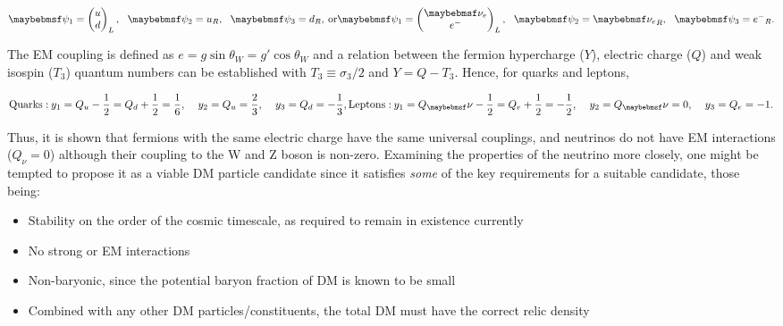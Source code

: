 \begin{equation} 
  \psi_1 = \begin{pmatrix} u \\ d \end{pmatrix}_L, \:\:\: \psi_2 = u_R, \:\:\: \psi_3 = d_R,\:\mathrm{or} \\
  \psi_1 = \begin{pmatrix} \nu_e \\ e^- \end{pmatrix}_L, \:\:\: \psi_2 = {\nu_e}_R, \:\:\: \psi_3 = {e^-}_R.
\end{equation}

The EM coupling is defined as $e = g\sin\theta_W = g'\cos\theta_W$ and a relation between the fermion hypercharge ($Y$), electric charge ($Q$) and weak isospin ($T_3$) quantum numbers can be established with $T_3 \equiv \sigma_3/2$ and $Y = Q - T_3$. Hence, for quarks and leptons,

\begin{equation}
  \mathrm{Quarks:}\: y_1 = Q_u - \frac{1}{2} = Q_d + \frac{1}{2} = \frac{1}{6},\:\:\:\:\: y_2 = Q_u = \frac{2}{3}, \:\:\:\:\: y_3 = Q_d = -\frac{1}{3}, \\
  \mathrm{Leptons:}\: y_1 = Q_\nu - \frac{1}{2} = Q_e + \frac{1}{2} = -\frac{1}{2},\:\:\:\:\: y_2 = Q_\nu = 0, \:\:\:\:\: y_3 = Q_e = -1.
\end{equation}

Thus, it is shown that fermions with the same electric charge have the same universal couplings, and neutrinos do not have EM interactions ($Q_\nu=0$) although their coupling to the W and Z boson is non-zero. Examining the properties of the neutrino more closely, one might be tempted to propose it as a viable DM particle candidate since it satisfies \textit{some} of the key requirements for a suitable candidate, those being:

\begin{itemize}
  \item Stability on the order of the cosmic timescale, as required to remain in existence currently
  \item No strong or EM interactions
  \item Non-baryonic, since the potential baryon fraction of DM is known to be small
  \item Combined with any other DM particles/constituents, the total DM must have the correct relic density
\end{itemize}


